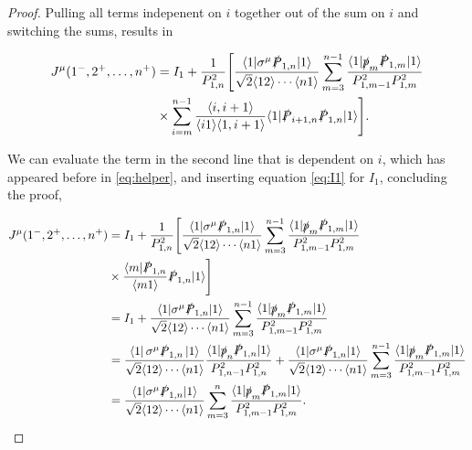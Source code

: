 \documentclass{article}
\theoremstyle{definition}
\numberwithin{equation}{section}
\begin{document}
\begin{proof}
    Pulling all terms indepenent on $i$ together out of the sum on $i$ and switching the sums, results in

    \begin{align*}
        J^{\mu}(1^{-}, 2^{+}, \dots , n^{+}) &= I_1 + \frac{1}{P_{1,n}^2} \Biggl[ \frac{ \langle 1 | \sigma^{\mu} \slashed{P}_{1,n} | 1 \rangle }{ \sqrt{2} \langle 12 \rangle \cdots \langle n1 \rangle } \sum_{m=3}^{n-1} \frac{ \langle 1 | \slashed{p}_m \slashed{P}_{1,m} | 1 \rangle }{ P_{1,m-1}^2 P_{1,m}^2 } \\
        &\times \sum_{i=m}^{n-1} \frac{ \langle i,i+1 \rangle }{ \langle i1 \rangle \langle 1,i+1 \rangle } \langle 1 | \slashed{P}_{i+1,n} \slashed{P}_{1,n} | 1 \rangle \Biggr].
    \end{align*}

    We can evaluate the term in the second line that is dependent on $i$, which has appeared before in \eqref{eq:helper}, and inserting equation \eqref{eq:I1} for $I_1$, concluding the proof,

    \begin{align*}
        J^{\mu}(1^{-}, 2^{+}, \dots , n^{+}) &= I_1 + \frac{1}{P_{1,n}^2} \Biggl[ \frac{ \langle 1 | \sigma^{\mu} \slashed{P}_{1,n} | 1 \rangle }{ \sqrt{2} \langle 12 \rangle \cdots \langle n1 \rangle } \sum_{m=3}^{n-1} \frac{ \langle 1 | \slashed{p}_m \slashed{P}_{1,m} | 1 \rangle }{ P_{1,m-1}^2 P_{1,m}^2 } \\
        &\times \frac{ \langle m | \slashed{P}_{1,n} }{ \langle m1 \rangle } \slashed{P}_{1,n} | 1 \rangle \Biggr] \\
        &= I_1 + \frac{ \langle 1 | \sigma^{\mu} \slashed{P}_{1,n} | 1 \rangle }{ \sqrt{2} \langle 12 \rangle \cdots \langle n1 \rangle } \sum_{m=3}^{n-1} \frac{ \langle 1 | \slashed{p}_m \slashed{P}_{1,m} | 1 \rangle }{ P_{1,m-1}^2 P_{1,m}^2 } \\
        &= \frac{ \bra{1} \sigma^{\mu} \slashed{P}_{1,n} \ket{1} }{ \sqrt{2} \langle 12 \rangle \cdots \langle n1 \rangle } \frac{ \langle 1 | \slashed{p}_{n} \slashed{P}_{1,n} | 1 \rangle }{ P_{1,n-1}^2 P_{1,n}^2 } + \frac{ \langle 1 | \sigma^{\mu} \slashed{P}_{1,n} | 1 \rangle }{ \sqrt{2} \langle 12 \rangle \cdots \langle n1 \rangle } \sum_{m=3}^{n-1} \frac{ \langle 1 | \slashed{p}_m \slashed{P}_{1,m} | 1 \rangle }{ P_{1,m-1}^2 P_{1,m}^2 } \\
        &= \frac{ \langle 1 | \sigma^{\mu} \slashed{P}_{1,n} | 1 \rangle }{ \sqrt{2} \langle 12 \rangle \cdots \langle n1 \rangle } \sum_{m=3}^{n} \frac{ \langle 1 | \slashed{p}_m \slashed{P}_{1,m} | 1 \rangle }{ P_{1,m-1}^2 P_{1,m}^2 }.
    \end{align*}

\end{proof}
\end{document}
